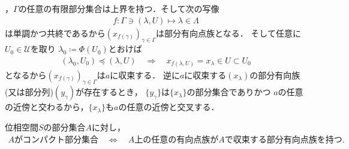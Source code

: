 \begin{prf}
		，$\Gamma$の任意の有限部分集合は上界を持つ．そして次の写像
		\begin{align}
			f:\Gamma \ni (\lambda,U) \longmapsto \lambda \in \Lambda
		\end{align}
		は単調かつ共終であるから$(x_{f(\gamma)})_{\gamma \in \Gamma}$は部分有向点族となる．
		そして任意に$U_0 \in \mathscr{U}$を取り
		$\lambda_0 \coloneqq \Phi(U_0)$とおけば
		\begin{align}
			(\lambda_0,U_0) \preceq (\lambda,U)
			\quad \Longrightarrow \quad
			x_{f(\lambda,U)} = x_\lambda \in U \subset U_0
		\end{align}
		となるから$(x_{f(\gamma)})_{\gamma \in \Gamma}$は$a$に収束する．
		逆に$a$に収束する$(x_\lambda)$の部分有向族(又は部分列)$(y_\gamma)$が存在するとき，
		$\{y_\gamma\}$は$\{x_\lambda\}$の部分集合でありかつ
		$a$の任意の近傍と交わるから，$\{x_\lambda\}$も$a$の任意の近傍と交叉する．
		\QED
	\end{prf}
	
	\begin{screen}
		\begin{thm}
			位相空間$S$の部分集合$A$に対し，
			\begin{align}
				\mbox{$A$がコンパクト部分集合}
				\quad \Longleftrightarrow \quad
				\mbox{$A$上の任意の有向点族が$A$で収束する部分有向点族を持つ}.
			\end{align}
		\end{thm}
	\end{screen}